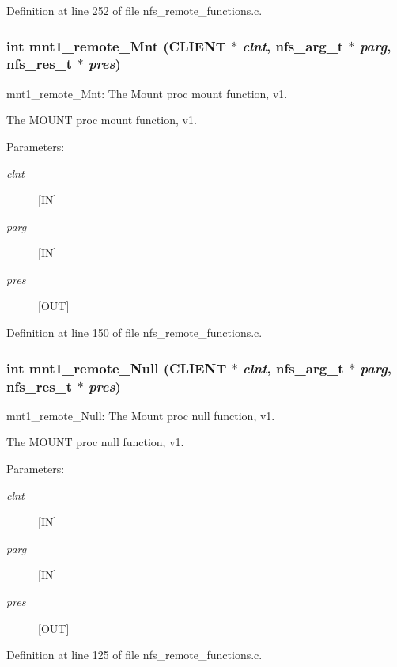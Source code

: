 Definition at line 252 of file nfs\_\-remote\_\-functions.c.
\subsubsection{\setlength{\rightskip}{0pt plus 5cm}int mnt1\_\-remote\_\-Mnt (CLIENT $\ast$ {\em clnt}, nfs\_\-arg\_\-t $\ast$ {\em parg}, nfs\_\-res\_\-t $\ast$ {\em pres})}\label{group__MNTprocs_ga1}


mnt1\_\-remote\_\-Mnt: The Mount proc mount function, v1.

The MOUNT proc mount function, v1.

\begin{Desc}
\item[Parameters:]
\begin{description}
\item[{\em clnt}][IN] \item[{\em parg}][IN] \item[{\em pres}][OUT] \end{description}
\end{Desc}


Definition at line 150 of file nfs\_\-remote\_\-functions.c.
\subsubsection{\setlength{\rightskip}{0pt plus 5cm}int mnt1\_\-remote\_\-Null (CLIENT $\ast$ {\em clnt}, nfs\_\-arg\_\-t $\ast$ {\em parg}, nfs\_\-res\_\-t $\ast$ {\em pres})}\label{group__MNTprocs_ga0}


mnt1\_\-remote\_\-Null: The Mount proc null function, v1.

The MOUNT proc null function, v1.

\begin{Desc}
\item[Parameters:]
\begin{description}
\item[{\em clnt}][IN] \item[{\em parg}][IN] \item[{\em pres}][OUT] \end{description}
\end{Desc}


Definition at line 125 of file nfs\_\-remote\_\-functions.c.
